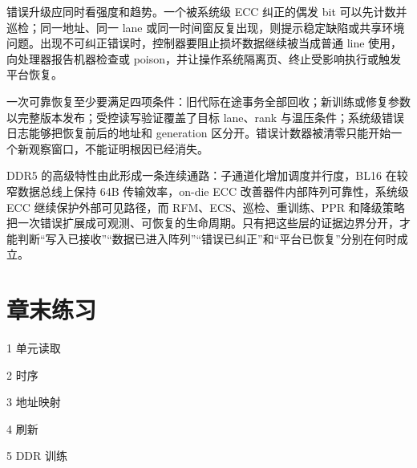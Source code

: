 错误升级应同时看强度和趋势。一个被系统级 ECC 纠正的偶发 bit 可以先计数并巡检；同一地址、同一 lane 或同一时间窗反复出现，则提示稳定缺陷或共享环境问题。出现不可纠正错误时，控制器要阻止损坏数据继续被当成普通 line 使用，向处理器报告机器检查或 poison，并让操作系统隔离页、终止受影响执行或触发平台恢复。


一次可靠恢复至少要满足四项条件：旧代际在途事务全部回收；新训练或修复参数以完整版本发布；受控读写验证覆盖了目标 lane、rank 与温压条件；系统级错误日志能够把恢复前后的地址和 generation 区分开。错误计数器被清零只能开始一个新观察窗口，不能证明根因已经消失。

DDR5 的高级特性由此形成一条连续通路：子通道化增加调度并行度，BL16 在较窄数据总线上保持 64B 传输效率，on-die ECC 改善器件内部阵列可靠性，系统级 ECC 继续保护外部可见路径，而 RFM、ECS、巡检、重训练、PPR 和降级策略把一次错误扩展成可观测、可恢复的生命周期。只有把这些层的证据边界分开，才能判断“写入已接收”“数据已进入阵列”“错误已纠正”和“平台已恢复”分别在何时成立。

\section*{章末练习}

\begin{chapterexercise}{1}
单元读取
\end{chapterexercise}

\begin{chapterexercise}{2}
时序
\end{chapterexercise}

\begin{chapterexercise}{3}
地址映射
\end{chapterexercise}

\begin{chapterexercise}{4}
刷新
\end{chapterexercise}

\begin{chapterexercise}{5}
DDR 训练
\end{chapterexercise}

